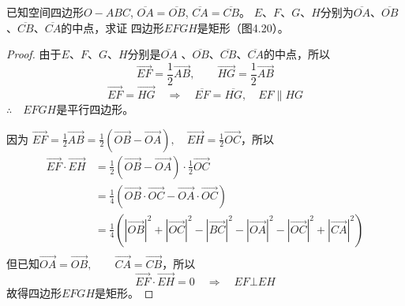 \begin{figure}[htp]\centering
    \begin{minipage}[t]{0.48\textwidth}
    \centering
{}
    \caption{}
    \end{minipage}
    \begin{minipage}[t]{0.48\textwidth}
    \centering
    \caption{}
    \end{minipage}
    \end{figure}

\begin{example}
    已知空间四边形$O-ABC$, $\overline{OA}=\overline{OB}$, $\overline{CA}=\overline{CB}$。
    $E$、$F$、$G$、$H$分别为$\overline{OA}$、$\overline{OB}$、$\overline{CB}$、$\overline{CA}$的中点，求证
    四边形$EFGH$是矩形（图4.20）。
\end{example}

\begin{proof}
由于$E$、$F$、$G$、$H$分别是$\overline{OA}$
、$\overline{OB}$、$\overline{CB}$、$\overline{CA}$的中点，所以
\[\Vec{EF}=\frac{1}{2}\Vec{AB},\qquad \Vec{HG}=\frac{1}{2}\Vec{AB}\]
\[\Vec{EF}=\Vec{HG}\quad \Rightarrow\quad \overline{EF}=\overline{HG},\quad EF\parallel HG\]
$\therefore\quad EFGH$是平行四边形。

因为
$\Vec{EF}=\frac{1}{2}\Vec{AB}=\frac{1}{2}(\Vec{OB}-\Vec{OA}),\quad \Vec{EH}=\frac{1}{2}\Vec{OC}$，所以
\[\begin{split}
        \Vec{E F} \cdot \Vec{E H} &=\frac{1}{2}(\Vec{O B}-\Vec{O A}) \cdot \frac{1}{2} \Vec{O C} \\
        &=\frac{1}{4}(\Vec{O B} \cdot \Vec{O C}-\Vec{O A} \cdot \Vec{O C}) \\
        &=\frac{1}{4}\left(|\Vec{O B}|^{2}+|\Vec{O C}|^{2}-|\Vec{B C}|^{2}-|\Vec{O A}|^{2}-|\Vec{O C}|^{2}+|\Vec{C A}|^{2}\right) \\
\end{split}\]
但已知$\Vec{O A}=\Vec{O B},\qquad \Vec{C A}=\Vec{C B}$，所以
\[\Vec{E F} \cdot \Vec{E H} =0 \quad \Rightarrow\quad  E F \bot E H\]
故得四边形$EFGH$是矩形。
\end{proof}

